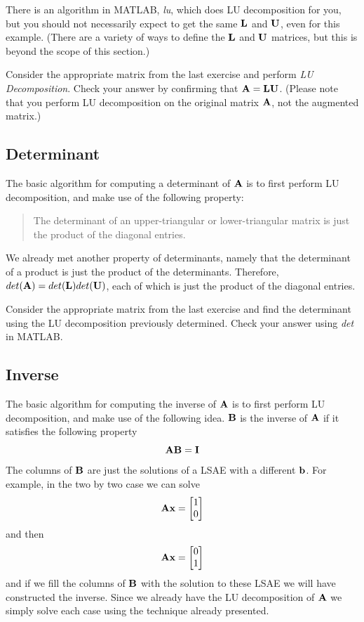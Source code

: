 There is an algorithm in MATLAB, \textit{lu}, which does LU decomposition for you, but you should not necessarily expect to get the same $\mathbf{L}$ and $\mathbf{U}$, even for this example. (There are a variety of ways to define the $\mathbf{L}$ and $\mathbf{U}$ matrices, but this is beyond the scope of this section.)

\begin{prob}
\be
\item Consider the appropriate matrix from the last exercise and perform \textit{LU Decomposition}. Check your answer by confirming that $\mathbf{A} = \mathbf{L} \mathbf{U}$. (Please note that you perform LU decomposition on the original matrix $\mathbf{A}$, not the augmented matrix.)
\ee
\end{prob}

\subsection{Determinant}

The basic algorithm for computing a determinant of $\mathbf{A}$ is to first perform LU decomposition, and make use of the following property:
\begin{quote}
The determinant of an upper-triangular or lower-triangular matrix is just the product of the diagonal entries.
\end{quote}
We already met another property of determinants, namely that the determinant of a product is just the product of the determinants. Therefore, $det(\mathbf{A}) = det(\mathbf{L}) det(\mathbf{U})$, each of which is just the product of the diagonal entries.

\begin{prob}
\be
\item Consider the appropriate matrix from the last exercise and find the determinant using the LU decomposition previously determined. Check your answer using \textit{det} in MATLAB.
\ee
\end{prob}

\subsection{Inverse}

The basic algorithm for computing the inverse of $\mathbf{A}$ is to first perform LU decomposition, and make use of the following idea. $\mathbf{B}$ is the inverse of $\mathbf{A}$ if it satisfies the following property
\[ \mathbf{A} \mathbf{B} = \mathbf{I} \]
The columns of $\mathbf{B}$ are just the solutions of a LSAE with a different $\mathbf{b}$. For example, in the two by two case we can solve
\[\mathbf{A} \mathbf{x} = \begin{bmatrix} 1 \\ 0 \end{bmatrix} \]
and then
\[\mathbf{A} \mathbf{x} = \begin{bmatrix} 0 \\ 1 \end{bmatrix} \]
and if we fill the columns of $\mathbf{B}$ with the solution to these LSAE we will have constructed the inverse. Since we already have the LU decomposition of $\mathbf{A}$ we simply solve each case using the technique already presented.

